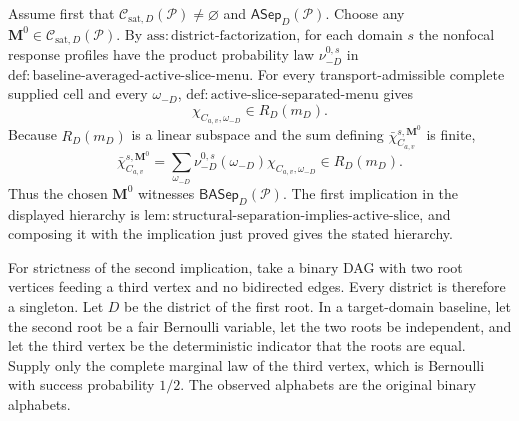 Assume first that \(\mathcal C_{\mathrm{sat},D}(\mathcal P)\ne\varnothing\) and \(\mathsf{ASep}_D(\mathcal P)\).  Choose any \(\mathbf M^0\in\mathcal C_{\mathrm{sat},D}(\mathcal P)\).  By \(\mathrm{ass:district\text{-}factorization}\), for each domain \(s\) the nonfocal response profiles have the product probability law \(\nu_{-D}^{0,s}\) in \(\mathrm{def:baseline\text{-}averaged\text{-}active\text{-}slice\text{-}menu}\).  For every transport-admissible complete supplied cell and every \(\omega_{-D}\), \(\mathrm{def:active\text{-}slice\text{-}separated\text{-}menu}\) gives
\[
\chi_{C_{a,v},\omega_{-D}}\in R_D(m_D).
\]
Because \(R_D(m_D)\) is a linear subspace and the sum defining \(\bar\chi_{C_{a,v}}^{s,\mathbf M^0}\) is finite,
\[
\bar\chi_{C_{a,v}}^{s,\mathbf M^0}
=\sum_{\omega_{-D}}\nu_{-D}^{0,s}(\omega_{-D})
\chi_{C_{a,v},\omega_{-D}}
\in R_D(m_D).
\]
Thus the chosen \(\mathbf M^0\) witnesses \(\mathsf{BASep}_D(\mathcal P)\).  The first implication in the displayed hierarchy is \(\mathrm{lem:structural\text{-}separation\text{-}implies\text{-}active\text{-}slice}\), and composing it with the implication just proved gives the stated hierarchy.

For strictness of the second implication, take a binary DAG with two root vertices feeding a third vertex and no bidirected edges.  Every district is therefore a singleton.  Let \(D\) be the district of the first root.  In a target-domain baseline, let the second root be a fair Bernoulli variable, let the two roots be independent, and let the third vertex be the deterministic indicator that the roots are equal.  Supply only the complete marginal law of the third vertex, which is Bernoulli with success probability \(1/2\).  The observed alphabets are the original binary alphabets.

